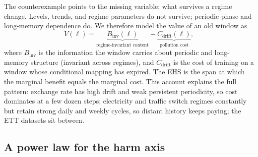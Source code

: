 The counterexample points to the missing variable: what survives a regime change. Levels, trends, and regime parameters do not survive; periodic phase and long-memory dependence do. We therefore model the value of an old window as
\begin{equation}
V(\ell) = \underbrace{B_{\mathrm{inv}}(\ell)}_{\text{regime-invariant content}} - \underbrace{C_{\mathrm{drift}}(\ell)}_{\text{pollution cost}},
\label{eq:twoaxis}
\end{equation}
where $B_{\mathrm{inv}}$ is the information the window carries about periodic and long-memory structure (invariant across regimes), and $C_{\mathrm{drift}}$ is the cost of training on a window whose conditional mapping has expired. The EHS is the span at which the marginal benefit equals the marginal cost. This account explains the full pattern: exchange rate has high drift and weak persistent periodicity, so cost dominates at a few dozen steps; electricity and traffic switch regimes constantly but retain strong daily and weekly cycles, so distant history keeps paying; the ETT datasets sit between.

\subsection{A power law for the harm axis}
\label{sec:powerlaw}

